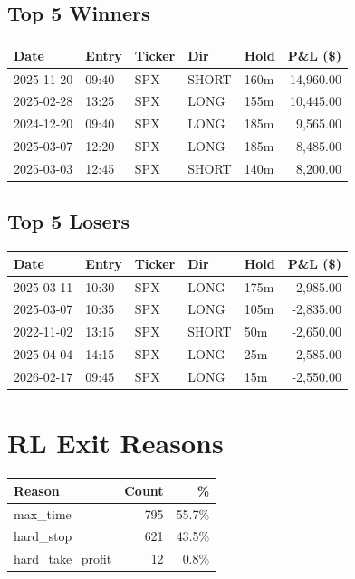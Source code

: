 \documentclass[11pt,a4paper,twoside]{article}
\begin{document}
\subsection{Top 5 Winners}
\noindent\begin{center}
\begin{tabular}{>{\color{txtmain}}l llll r}
\toprule
\rowcolor{cardbg}
\textbf{Date} & \textbf{Entry} & \textbf{Ticker} & \textbf{Dir} & \textbf{Hold} & \textbf{P\&L (\$)} \\
\midrule
2025-11-20 & 09:40 & SPX & SHORT & 160m & \textcolor{wingreen}{14,960.00} \\
2025-02-28 & 13:25 & SPX & LONG & 155m & \textcolor{wingreen}{10,445.00} \\
2024-12-20 & 09:40 & SPX & LONG & 185m & \textcolor{wingreen}{9,565.00} \\
2025-03-07 & 12:20 & SPX & LONG & 185m & \textcolor{wingreen}{8,485.00} \\
2025-03-03 & 12:45 & SPX & SHORT & 140m & \textcolor{wingreen}{8,200.00} \\
\bottomrule
\end{tabular}
\end{center}
\subsection{Top 5 Losers}
\noindent\begin{center}
\begin{tabular}{>{\color{txtmain}}l llll r}
\toprule
\rowcolor{cardbg}
\textbf{Date} & \textbf{Entry} & \textbf{Ticker} & \textbf{Dir} & \textbf{Hold} & \textbf{P\&L (\$)} \\
\midrule
2025-03-11 & 10:30 & SPX & LONG & 175m & \textcolor{lossred}{-2,985.00} \\
2025-03-07 & 10:35 & SPX & LONG & 105m & \textcolor{lossred}{-2,835.00} \\
2022-11-02 & 13:15 & SPX & SHORT & 50m & \textcolor{lossred}{-2,650.00} \\
2025-04-04 & 14:15 & SPX & LONG & 25m & \textcolor{lossred}{-2,585.00} \\
2026-02-17 & 09:45 & SPX & LONG & 15m & \textcolor{lossred}{-2,550.00} \\
\bottomrule
\end{tabular}
\end{center}
\clearpage
\section{RL Exit Reasons}
\noindent\begin{center}
\begin{tabular}{>{\color{txtmain}}l rr}
\toprule
\rowcolor{cardbg}
\textbf{Reason} & \textbf{Count} & \textbf{\%} \\
\midrule
max\_time & 795 & 55.7\% \\
hard\_stop & 621 & 43.5\% \\
hard\_take\_profit & 12 & 0.8\% \\
\bottomrule
\end{tabular}
\end{center}
\end{document}
